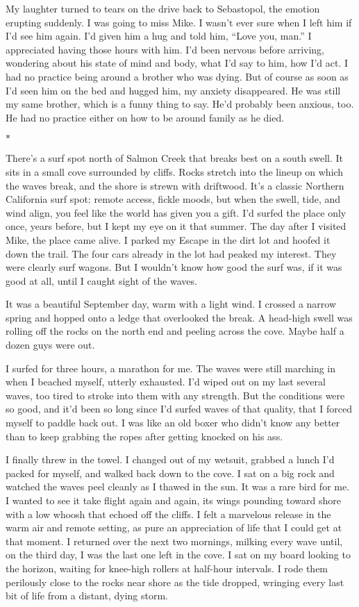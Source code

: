 \documentclass[12pt]{book}
\begin{document}
My laughter turned to tears on the drive back to Sebastopol, the emotion erupting suddenly. I was going to miss Mike. I wasn't ever sure when I left him if I'd see him again. I'd given him a hug and told him, ``Love you, man.'' I appreciated having those hours with him. I'd been nervous before arriving, wondering about his state of mind and body, what I'd say to him, how I'd act. I had no practice being around a brother who was dying. But of course as soon as I'd seen him on the bed and hugged him, my anxiety disappeared. He was still my same brother, which is a funny thing to say. He'd probably been anxious, too. He had no practice either on how to be around family as he died.

\begin{center}$*$\end{center}

There's a surf spot north of Salmon Creek that breaks best on a south swell. It sits in a small cove surrounded by cliffs. Rocks stretch into the lineup on which the waves break, and the shore is strewn with driftwood. It's a classic Northern California surf spot: remote access, fickle moods, but when the swell, tide, and wind align, you feel like the world has given you a gift. I'd surfed the place only once, years before, but I kept my eye on it that summer. The day after I visited Mike, the place came alive. I parked my Escape in the dirt lot and hoofed it down the trail. The four cars already in the lot had peaked my interest. They were clearly surf wagons. But I wouldn't know how good the surf was, if it was good at all, until I caught sight of the waves.

It was a beautiful September day, warm with a light wind. I crossed a narrow spring and hopped onto a ledge that overlooked the break. A head-high swell was rolling off the rocks on the north end and peeling across the cove. Maybe half a dozen guys were out.

I surfed for three hours, a marathon for me. The waves were still marching in when I beached myself, utterly exhausted. I'd wiped out on my last several waves, too tired to stroke into them with any strength. But the conditions were so good, and it'd been so long since I'd surfed waves of that quality, that I forced myself to paddle back out. I was like an old boxer who didn't know any better than to keep grabbing the ropes after getting knocked on his ass.

I finally threw in the towel. I changed out of my wetsuit, grabbed a lunch I'd packed for myself, and walked back down to the cove. I sat on a big rock and watched the waves peel cleanly as I thawed in the sun. It was a rare bird for me. I wanted to see it take flight again and again, its wings pounding toward shore with a low whoosh that echoed off the cliffs. I felt a marvelous release in the warm air and remote setting, as pure an appreciation of life that I could get at that moment. I returned over the next two mornings, milking every wave until, on the third day, I was the last one left in the cove. I sat on my board looking to the horizon, waiting for knee-high rollers at half-hour intervals. I rode them perilously close to the rocks near shore as the tide dropped, wringing every last bit of life from a distant, dying storm.
\end{document}
